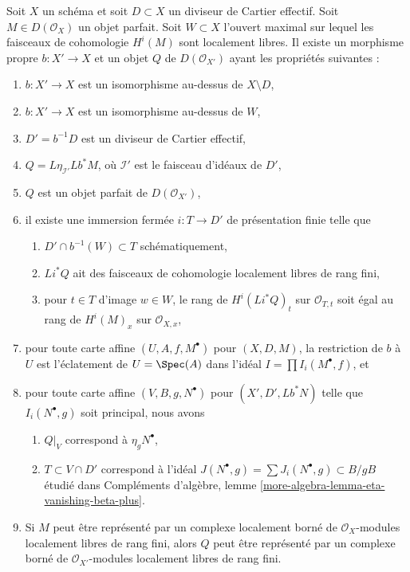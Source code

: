 \begin{lemma}
\label{lemma-complex-and-divisor-derived}
Soit $X$ un schéma et soit $D \subset X$ un diviseur de Cartier effectif. Soit
$M \in D(\mathcal{O}_X)$ un objet parfait. Soit $W \subset X$ l'ouvert maximal
sur lequel les faisceaux de cohomologie $H^i(M)$ sont localement libres.
Il existe un morphisme propre $b : X' \longrightarrow X$
et un objet $Q$ de $D(\mathcal{O}_{X'})$ ayant les propriétés suivantes :
\begin{enumerate}
\item $b : X' \to X$ est un isomorphisme au-dessus de $X \setminus D$,
\item $b : X' \to X$ est un isomorphisme au-dessus de $W$,
\item $D' = b^{-1}D$ est un diviseur de Cartier effectif,
\item $Q = L\eta_{\mathcal{I}'}Lb^*M$, où $\mathcal{I}'$
est le faisceau d'idéaux de $D'$,
\item $Q$ est un objet parfait de $D(\mathcal{O}_{X'})$,
\item il existe une immersion fermée $i : T \to D'$ de présentation finie
telle que
\begin{enumerate}
\item $D' \cap b^{-1}(W) \subset T$ schématiquement,
\item $Li^*Q$ ait des faisceaux de cohomologie localement libres de rang fini,
\item pour $t \in T$ d'image $w \in W$, le rang
de $H^i(Li^*Q)_t$ sur $\mathcal{O}_{T, t}$ soit égal au
rang de $H^i(M)_x$ sur $\mathcal{O}_{X, x}$,
\end{enumerate}
\item pour toute carte affine $(U, A, f, M^\bullet)$ pour $(X, D, M)$,
la restriction de $b$ à $U$ est l'éclatement de $U = \Spec(A)$
dans l'idéal $I = \prod I_i(M^\bullet, f)$, et
\item pour toute carte affine $(V, B, g, N^\bullet)$ pour $(X', D', Lb^*N)$
telle que $I_i(N^\bullet, g)$ soit principal, nous avons
\begin{enumerate}
\item $Q|_V$ correspond à $\eta_gN^\bullet$,
\item $T \subset V \cap D'$ correspond à l'idéal
$J(N^\bullet, g) = \sum J_i(N^\bullet, g) \subset B/gB$
étudié dans
Compléments d'algèbre, lemme \ref{more-algebra-lemma-eta-vanishing-beta-plus}.
\end{enumerate}
\item Si $M$ peut être représenté par un complexe localement borné
de $\mathcal{O}_X$-modules localement libres de rang fini, alors $Q$ peut
être représenté par un complexe borné de
$\mathcal{O}_{X'}$-modules localement libres de rang fini.
\end{enumerate}
\end{lemma}

